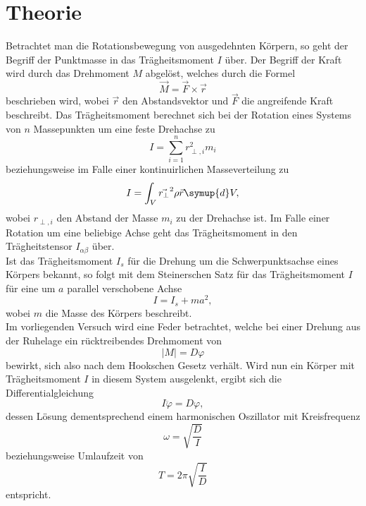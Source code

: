\section{Theorie}
\label{sec:Theorie}
Betrachtet man die Rotationsbewegung von ausgedehnten Körpern, so geht der Begriff der Punktmasse in das Trägheitsmoment $I$ über.
Der Begriff der Kraft wird durch das Drehmoment $M$ abgelöst, welches durch die Formel
\begin{equation}
  \vec{M} = \vec{F} \times \vec{r}
\end{equation}
beschrieben wird, wobei $\vec{r}$ den Abstandsvektor und $\vec{F}$ die angreifende Kraft beschreibt.
Das Trägheitsmoment berechnet sich bei der Rotation eines Systems von $n$ Massepunkten um eine feste Drehachse zu
\begin{equation}
  I = \sum_{i=1}^n r_{\perp, i}^2 m_i
  \label{eqn:tm1}
\end{equation}
beziehungsweise im Falle einer kontinuirlichen Masseverteilung zu
\begin{equation}
  I = \int_V^{} \vec{r_{\perp}}^2 \rho{\vec{r}} \symup{d}V,
  \label{eqn:tm2}
\end{equation}
wobei $r_{\perp, i}$ den Abstand der Masse $m_i$ zu der Drehachse ist.
Im Falle einer Rotation um eine beliebige Achse geht das Trägheitsmoment in den Trägheitstensor $I_{\alpha \beta}$ über.\\
Ist das Trägheitsmoment $I_s$ für die Drehung um die Schwerpunktsachse eines Körpers bekannt, so folgt mit dem Steinerschen Satz für das Trägheitsmoment $I$ für eine um $a$ parallel verschobene Achse
\begin{equation}
  I = I_s + m a^2,
  \label{eqn:steiner}
\end{equation}
wobei $m$ die Masse des Körpers beschreibt.\\
Im vorliegenden Versuch wird eine Feder betrachtet, welche bei einer Drehung aus der Ruhelage ein rücktreibendes Drehmoment von
\begin{equation}
  \lvert M \rvert = D \varphi
\end{equation}
bewirkt, sich also nach dem Hookschen Gesetz verhält.
Wird nun ein Körper mit Trägheitsmoment $I$ in diesem System ausgelenkt, ergibt sich die Differentialgleichung
\begin{equation}
  I \ddot{\varphi} = D \varphi,
\end{equation}
dessen Lösung dementsprechend einem harmonischen Oszillator mit Kreisfrequenz
\begin{equation}
  \omega = \sqrt{\frac{D}{I}}
\end{equation}
beziehungsweise Umlaufzeit von
\begin{equation}
  T = 2 \pi \sqrt{\frac{I}{D}} \label{eqn:zeiten}
\end{equation}
entspricht.

